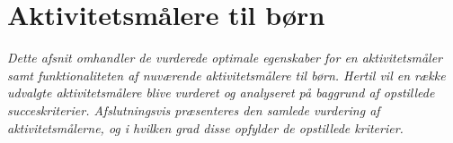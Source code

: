 \section{Aktivitetsmålere til børn} \label{tracker_intro}
\textit{Dette afsnit omhandler de vurderede optimale egenskaber for en aktivitetsmåler samt funktionaliteten af nuværende aktivitetsmålere til børn. Hertil vil en række udvalgte aktivitetsmålere blive vurderet og analyseret på baggrund af opstillede succeskriterier. Afslutningsvis præsenteres den samlede vurdering af aktivitetsmålerne, og i hvilken grad disse opfylder de opstillede kriterier.}
%

